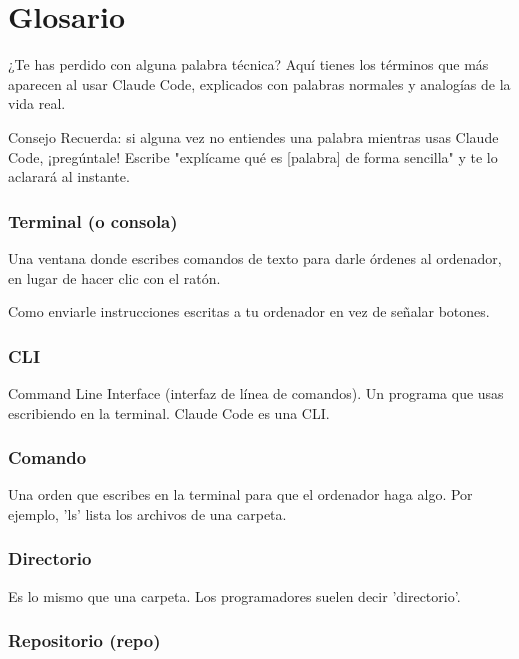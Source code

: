 \documentclass[11pt,a4paper]{report}
\begin{document}
\chapter{Glosario}

¿Te has perdido con alguna palabra técnica? Aquí tienes los términos que más aparecen al usar Claude Code, explicados con palabras normales y analogías de la vida real.

\begin{calloutbox}{Consejo}
Recuerda: si alguna vez no entiendes una palabra mientras usas Claude Code, ¡pregúntale! Escribe "explícame qué es [palabra] de forma sencilla" y te lo aclarará al instante.\end{calloutbox}

\subsection{Terminal (o consola)}

Una ventana donde escribes comandos de texto para darle órdenes al ordenador, en lugar de hacer clic con el ratón.

Como enviarle instrucciones escritas a tu ordenador en vez de señalar botones.

\subsection{CLI}

Command Line Interface (interfaz de línea de comandos). Un programa que usas escribiendo en la terminal. Claude Code es una CLI.

\subsection{Comando}

Una orden que escribes en la terminal para que el ordenador haga algo. Por ejemplo, 'ls' lista los archivos de una carpeta.

\subsection{Directorio}

Es lo mismo que una carpeta. Los programadores suelen decir 'directorio'.

\subsection{Repositorio (repo)}
\end{document}
